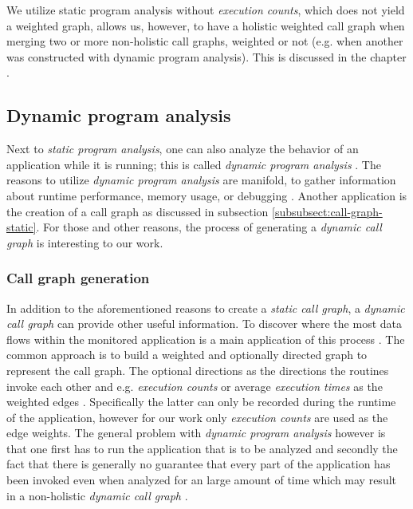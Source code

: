 \documentclass[12pt,a4paper]{report}
\begin{document}
We utilize static program analysis without \textit{execution counts}, which
does not yield a weighted graph, allows us, however, to have a holistic
weighted call graph when merging two or more non\hyp holistic call graphs,
weighted or not (e.g. when another was constructed with dynamic program analysis).
This is discussed in the chapter \textit{}.


\subsection{Dynamic program analysis} \label{subsect:background-dynamic-analysis}

Next to \textit{static program analysis}, one can also analyze the behavior of
an application while it is running; this is called \textit{dynamic program
analysis} \cite{ernst2003static}. The reasons to utilize \textit{dynamic
program analysis} are manifold, to gather information about runtime
performance, memory usage, or debugging \cite{ernst2003static}. Another
application is the creation of a call graph as discussed in subsection
\ref{subsubsect:call-graph-static}. For those and other reasons, the process
of generating a \textit{dynamic call graph} is interesting to our work.


\subsubsection{Call graph generation} \label{subsubsect:call-graph-dynamic}
In addition to the aforementioned reasons to create a \textit{static call
graph}, a \textit{dynamic call graph} can provide other useful information.
To discover where the most data flows within the monitored
application is a main application of this process \cite{graham1982gprof}. The
common approach is to build a weighted and optionally directed graph to
represent the call graph. The optional directions as the directions the
routines invoke each other and e.g. \textit{execution counts} or average
\textit{execution times} as the weighted edges \cite{graham1982gprof}.
Specifically the latter can only be recorded during the runtime of the
application, however for our work only \textit{execution counts} are used as
the edge weights. The general problem with \textit{dynamic program analysis}
however is that one first has to run the application that is to be analyzed and
secondly the fact that there is generally no guarantee that every part of
the application has been invoked even when analyzed for an large amount of
time which may result in a non\hyp holistic \textit{dynamic call graph}
\cite{graham1982gprof}.
\end{document}

